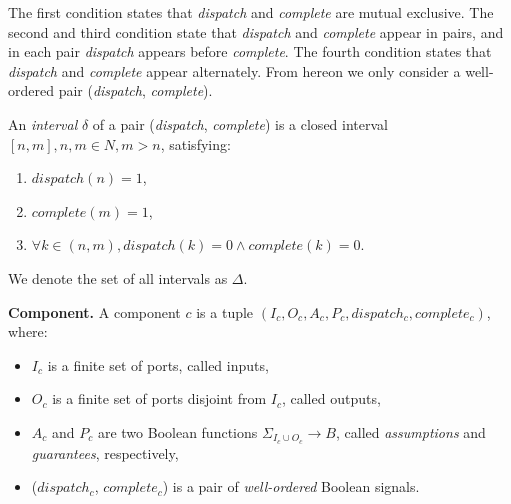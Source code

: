The first condition states that \emph{dispatch} and \emph{complete} are mutual exclusive. The second and third condition state that \emph{dispatch} and \emph{complete} appear in pairs, and in each pair \emph{dispatch} appears before \emph{complete}. The fourth condition states that \emph{dispatch} and \emph{complete} appear alternately. 
From hereon we only consider a well-ordered pair (\emph{dispatch}, \emph{complete}).

An \emph{interval} $\delta$ of a pair (\emph{dispatch}, \emph{complete}) is a closed interval $[n, m], n,m \in N, m>n$, satisfying:

\begin{enumerate}
	\item $ dispatch(n) = 1 $, 
	\item $ complete(m) = 1 $, 
	\item $ \forall k\in (n, m), dispatch(k)=0 \wedge complete(k)=0 $.
\end{enumerate}

We denote the set of all intervals as $\Delta$.

{\bf Component.}
A component $c$ is a tuple $(I_c, O_c, A_c, P_c, dispatch_c, complete_c)$, where: 

\begin{itemize}
    	\item $I_c$ is a finite set of ports, called inputs,
    	\item $O_c$ is a finite set of ports disjoint from $I_c$, called outputs,
	\item $A_c$ and $P_c$ are two Boolean functions $\Sigma_{I_c \cup O_c} \rightarrow B$, called \emph{assumptions} and \emph{guarantees}, respectively,	
    	\item ($dispatch_c$, $complete_c$) is a pair of \emph{well-ordered} Boolean signals.
\end{itemize}


